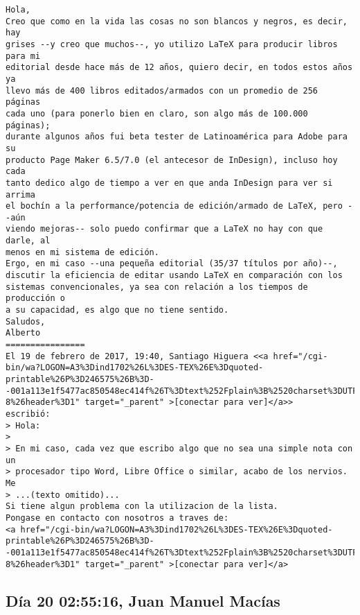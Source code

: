 \documentclass[a4paper,10pt]{article}
\begin{document}
\begin{lstlisting}
Hola,
Creo que como en la vida las cosas no son blancos y negros, es decir, hay
grises --y creo que muchos--, yo utilizo LaTeX para producir libros para mi
editorial desde hace más de 12 años, quiero decir, en todos estos años ya
llevo más de 400 libros editados/armados con un promedio de 256 páginas
cada uno (para ponerlo bien en claro, son algo más de 100.000 páginas);
durante algunos años fui beta tester de Latinoamérica para Adobe para su
producto Page Maker 6.5/7.0 (el antecesor de InDesign), incluso hoy cada
tanto dedico algo de tiempo a ver en que anda InDesign para ver si arrima
el bochín a la performance/potencia de edición/armado de LaTeX, pero --aún
viendo mejoras-- solo puedo confirmar que a LaTeX no hay con que darle, al
menos en mi sistema de edición.
Ergo, en mi caso --una pequeña editorial (35/37 títulos por año)--,
discutir la eficiencia de editar usando LaTeX en comparación con los
sistemas convencionales, ya sea con relación a los tiempos de producción o
a su capacidad, es algo que no tiene sentido.
Saludos,
Alberto
================
El 19 de febrero de 2017, 19:40, Santiago Higuera <<a href="/cgi-bin/wa?LOGON=A3%3Dind1702%26L%3DES-TEX%26E%3Dquoted-printable%26P%3D246575%26B%3D--001a113e1f5477ac850548ec414f%26T%3Dtext%252Fplain%3B%2520charset%3DUTF-8%26header%3D1" target="_parent" >[conectar para ver]</a>>
escribió:
> Hola:
>
> En mi caso, cada vez que escribo algo que no sea una simple nota con un
> procesador tipo Word, Libre Office o similar, acabo de los nervios. Me
> ...(texto omitido)...
Si tiene algun problema con la utilizacion de la lista.
Pongase en contacto con nosotros a traves de:
<a href="/cgi-bin/wa?LOGON=A3%3Dind1702%26L%3DES-TEX%26E%3Dquoted-printable%26P%3D246575%26B%3D--001a113e1f5477ac850548ec414f%26T%3Dtext%252Fplain%3B%2520charset%3DUTF-8%26header%3D1" target="_parent" >[conectar para ver]</a>

\end{lstlisting}

\subsection{Día 20 02:55:16, Juan Manuel Macías}
\end{document}
